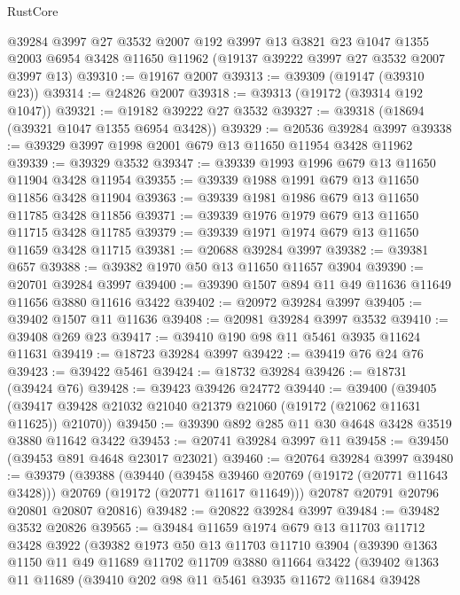 \begin{lexlean}{RustCore}
\begin{coremodule}
    @39284
    @3997
    @27
    @3532
    @2007
    @192
    @3997
    @13
    @3821
    @23
    @1047
    @1355
    @2003
    @6954
    @3428
    @11650
    @11962
    (@19137 @39222 @3997 @27 @3532 @2007 @3997 @13)
@39310 := @19167 @2007
@39313 := @39309 (@19147 (@39310 @23))
@39314 := @24826 @2007
@39318 := @39313 (@19172 (@39314 @192 @1047))
@39321 := @19182 @39222 @27 @3532
@39327 := @39318 (@18694 (@39321 @1047 @1355 @6954 @3428))
@39329 := @20536 @39284 @3997
@39338 := @39329 @3997 @1998 @2001 @679 @13 @11650 @11954 @3428 @11962
@39339 := @39329 @3532
@39347 := @39339 @1993 @1996 @679 @13 @11650 @11904 @3428 @11954
@39355 := @39339 @1988 @1991 @679 @13 @11650 @11856 @3428 @11904
@39363 := @39339 @1981 @1986 @679 @13 @11650 @11785 @3428 @11856
@39371 := @39339 @1976 @1979 @679 @13 @11650 @11715 @3428 @11785
@39379 := @39339 @1971 @1974 @679 @13 @11650 @11659 @3428 @11715
@39381 := @20688 @39284 @3997
@39382 := @39381 @657
@39388 := @39382 @1970 @50 @13 @11650 @11657 @3904
@39390 := @20701 @39284 @3997
@39400 := @39390 @1507 @894 @11 @49 @11636 @11649 @11656 @3880 @11616 @3422
@39402 := @20972 @39284 @3997
@39405 := @39402 @1507 @11 @11636
@39408 := @20981 @39284 @3997 @3532
@39410 := @39408 @269 @23
@39417 := @39410 @190 @98 @11 @5461 @3935 @11624 @11631
@39419 := @18723 @39284 @3997
@39422 := @39419 @76 @24 @76
@39423 := @39422 @5461
@39424 := @18732 @39284
@39426 := @18731 (@39424 @76)
@39428 := @39423 @39426 @24772
@39440 := @39400
    (@39405 (@39417 @39428 @21032 @21040 @21379 @21060 (@19172 (@21062 @11631 @11625)) @21070))
@39450 := @39390 @892 @285 @11 @30 @4648 @3428 @3519 @3880 @11642 @3422
@39453 := @20741 @39284 @3997 @11
@39458 := @39450 (@39453 @891 @4648 @23017 @23021)
@39460 := @20764 @39284 @3997
@39480 := @39379
    (@39388
      (@39440
        (@39458 @39460 @20769 (@19172 (@20771 @11643 @3428)))
        @20769
        (@19172 (@20771 @11617 @11649)))
      @20787
      @20791
      @20796
      @20801
      @20807
      @20816)
@39482 := @20822 @39284 @3997
@39484 := @39482 @3532 @20826
@39565 := @39484
    @11659
    @1974
    @679
    @13
    @11703
    @11712
    @3428
    @3922
    (@39382
      @1973
      @50
      @13
      @11703
      @11710
      @3904
      (@39390
        @1363
        @1150
        @11
        @49
        @11689
        @11702
        @11709
        @3880
        @11664
        @3422
        (@39402
          @1363
          @11
          @11689
          (@39410
            @202
            @98
            @11
            @5461
            @3935
            @11672
            @11684
            @39428

\end{coremodule}
\end{lexlean}
